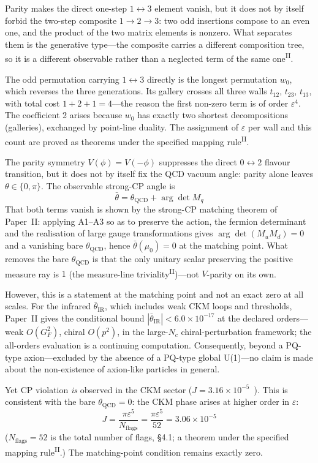 \documentclass[12pt,a4paper]{article}
\newcommand{\PII}{\textsuperscript{\textup{II}}}
\begin{document}
Parity makes the direct one-step $1 \leftrightarrow 3$ element vanish, but it does not by itself forbid the two-step composite $1 \to 2 \to 3$: two odd insertions compose to an even one, and the product of the two matrix elements is nonzero. What separates them is the generative type---the composite carries a different composition tree, so it is a different observable rather than a neglected term of the same one\PII{}.

The odd permutation carrying $1 \leftrightarrow 3$ directly is the longest permutation $w_0$, which reverses the three generations. Its gallery crosses all three walls $t_{12}$, $t_{23}$, $t_{13}$, with total cost $1 + 2 + 1 = 4$---the reason the first non-zero term is of order $\varepsilon^4$. The coefficient 2 arises because $w_0$ has exactly two shortest decompositions (galleries), exchanged by point-line duality. The assignment of $\varepsilon$ per wall and this count are proved as theorems under the specified mapping rule\PII{}.

The parity symmetry $V(\phi) = V(-\phi)$ suppresses the direct
$0\leftrightarrow2$ flavour transition, but it does not by itself fix
the QCD vacuum angle: parity alone leaves $\theta\in\{0,\pi\}$.
The observable strong-CP angle is
\[\bar\theta = \theta_\mathrm{QCD} + \arg\det M_q\]
That both terms vanish is shown by the strong-CP matching theorem of Paper~II: applying A1--A3 so as to preserve the action, the fermion determinant and the realisation of large gauge transformations gives $\arg\det(M_uM_d) = 0$ and a vanishing bare $\theta_\mathrm{QCD}$, hence $\bar\theta(\mu_0) = 0$ at the matching point. What removes the bare $\theta_\mathrm{QCD}$ is that the only unitary scalar preserving the positive measure ray is $1$ (the measure-line triviality\PII{})---not $V$-parity on its own.

However, this is a statement at the matching point and not an exact zero at all scales. For the infrared $\bar\theta_\mathrm{IR}$, which includes weak CKM loops and thresholds, Paper~II gives the conditional bound $|\bar\theta_\mathrm{IR}| < 6.0\times10^{-17}$ at the declared orders---weak $O(G_F^2)$, chiral $O(p^2)$, in the large-$N_c$ chiral-perturbation framework; the all-orders evaluation is a continuing computation. Consequently, beyond a PQ-type axion---excluded by the absence of a PQ-type global U(1)---no claim is made about the non-existence of axion-like particles in general.

Yet CP violation \emph{is} observed in the CKM sector ($J = 3.16 \times 10^{-5}$~\cite{pdg}). This is consistent with the bare $\theta_\mathrm{QCD} = 0$: the CKM phase arises at higher order in $\varepsilon$:
\[J = \frac{\pi\varepsilon^5}{N_\mathrm{flags}} = \frac{\pi\varepsilon^5}{52} = 3.06\times10^{-5}\]
($N_\mathrm{flags} = 52$ is the total number of flags, \S4.1; a theorem under the specified mapping rule\PII{}.) The matching-point condition remains exactly zero.
\end{document}
